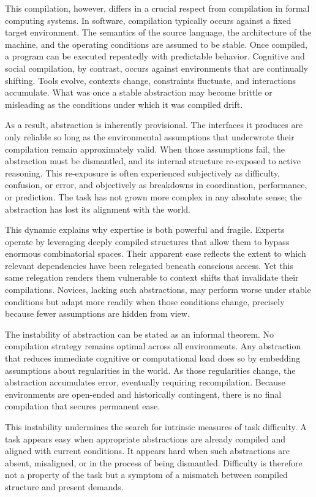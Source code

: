\documentclass[12pt]{article}
\begin{document}
This compilation, however, differs in a crucial respect from compilation in formal computing systems. In software, compilation typically occurs against a fixed target environment. The semantics of the source language, the architecture of the machine, and the operating conditions are assumed to be stable. Once compiled, a program can be executed repeatedly with predictable behavior. Cognitive and social compilation, by contrast, occurs against environments that are continually shifting. Tools evolve, contexts change, constraints fluctuate, and interactions accumulate. What was once a stable abstraction may become brittle or misleading as the conditions under which it was compiled drift.

As a result, abstraction is inherently provisional. The interfaces it produces are only reliable so long as the environmental assumptions that underwrote their compilation remain approximately valid. When those assumptions fail, the abstraction must be dismantled, and its internal structure re-exposed to active reasoning. This re-exposure is often experienced subjectively as difficulty, confusion, or error, and objectively as breakdowns in coordination, performance, or prediction. The task has not grown more complex in any absolute sense; the abstraction has lost its alignment with the world.

This dynamic explains why expertise is both powerful and fragile. Experts operate by leveraging deeply compiled structures that allow them to bypass enormous combinatorial spaces. Their apparent ease reflects the extent to which relevant dependencies have been relegated beneath conscious access. Yet this same relegation renders them vulnerable to context shifts that invalidate their compilations. Novices, lacking such abstractions, may perform worse under stable conditions but adapt more readily when those conditions change, precisely because fewer assumptions are hidden from view.

The instability of abstraction can be stated as an informal theorem. No compilation strategy remains optimal across all environments. Any abstraction that reduces immediate cognitive or computational load does so by embedding assumptions about regularities in the world. As those regularities change, the abstraction accumulates error, eventually requiring recompilation. Because environments are open-ended and historically contingent, there is no final compilation that secures permanent ease.

This instability undermines the search for intrinsic measures of task difficulty. A task appears easy when appropriate abstractions are already compiled and aligned with current conditions. It appears hard when such abstractions are absent, misaligned, or in the process of being dismantled. Difficulty is therefore not a property of the task but a symptom of a mismatch between compiled structure and present demands.
\end{document}
